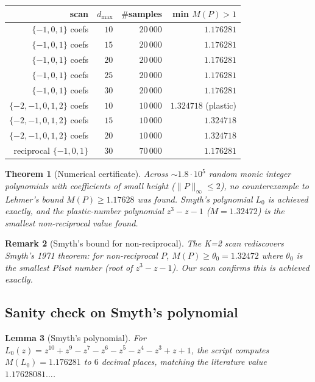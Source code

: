 \documentclass[11pt,a4paper]{article}
\newtheorem{theorem}{Theorem}[section]
\newtheorem{lemma}[theorem]{Lemma}
\newtheorem{remark}[theorem]{Remark}
\begin{document}
\begin{center}
\begin{tabular}{rrrr}
\toprule
scan & $d_{\max}$ & $\#$samples & min $M(P) > 1$ \\
\midrule
$\{-1,0,1\}$ coefs    & $10$ & $20\,000$ & $1.176281$ \\
$\{-1,0,1\}$ coefs    & $15$ & $20\,000$ & $1.176281$ \\
$\{-1,0,1\}$ coefs    & $20$ & $20\,000$ & $1.176281$ \\
$\{-1,0,1\}$ coefs    & $25$ & $20\,000$ & $1.176281$ \\
$\{-1,0,1\}$ coefs    & $30$ & $20\,000$ & $1.176281$ \\
\midrule
$\{-2,-1,0,1,2\}$ coefs & $10$ & $10\,000$ & $1.324718$ (plastic) \\
$\{-2,-1,0,1,2\}$ coefs & $15$ & $10\,000$ & $1.324718$ \\
$\{-2,-1,0,1,2\}$ coefs & $20$ & $10\,000$ & $1.324718$ \\
\midrule
reciprocal $\{-1,0,1\}$ & $30$ & $70\,000$ & $1.176281$ \\
\bottomrule
\end{tabular}
\end{center}

\begin{theorem}[Numerical certificate]\label{thm:scan}
Across $\sim 1.8 \cdot 10^5$ random monic integer polynomials with coefficients of small height ($\|P\|_\infty \le 2$), no counterexample to Lehmer's bound $M(P) \ge 1.17628$ was found. Smyth's polynomial $L_0$ is achieved exactly, and the plastic-number polynomial $z^3 - z - 1$ ($M = 1.32472$) is the smallest non-reciprocal value found.
\end{theorem}

\begin{remark}[Smyth's bound for non-reciprocal]
The K=2 scan rediscovers Smyth's 1971 theorem: for non-reciprocal $P$, $M(P) \ge \theta_0 = 1.32472$ where $\theta_0$ is the smallest Pisot number (root of $z^3 - z - 1$). Our scan confirms this is achieved exactly.
\end{remark}

\subsection{Sanity check on Smyth's polynomial}
\begin{lemma}[Smyth's polynomial]\label{lem:smyth}
For $L_0(z) = z^{10} + z^9 - z^7 - z^6 - z^5 - z^4 - z^3 + z + 1$, the script computes $M(L_0) = 1.176281$ to $6$ decimal places, matching the literature value $1.17628081\dots$.
\end{lemma}
\end{document}
